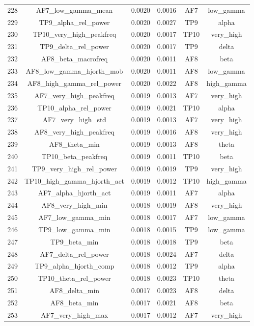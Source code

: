 \begin{table}[hptb]
\begin{table}
\begin{tabular}{cccccc}
228 & AF7_low_gamma_mean & 0.0020 & 0.0016 & AF7 & low_gamma \\
229 & TP9_alpha_rel_power & 0.0020 & 0.0027 & TP9 & alpha \\
230 & TP10_very_high_peakfreq & 0.0020 & 0.0017 & TP10 & very_high \\
231 & TP9_delta_rel_power & 0.0020 & 0.0017 & TP9 & delta \\
232 & AF8_beta_macrofreq & 0.0020 & 0.0011 & AF8 & beta \\
233 & AF8_low_gamma_hjorth_mob & 0.0020 & 0.0011 & AF8 & low_gamma \\
234 & AF8_high_gamma_rel_power & 0.0020 & 0.0022 & AF8 & high_gamma \\
235 & AF7_very_high_peakfreq & 0.0019 & 0.0013 & AF7 & very_high \\
236 & TP10_alpha_rel_power & 0.0019 & 0.0021 & TP10 & alpha \\
237 & AF7_very_high_std & 0.0019 & 0.0013 & AF7 & very_high \\
238 & AF8_very_high_peakfreq & 0.0019 & 0.0016 & AF8 & very_high \\
239 & AF8_theta_min & 0.0019 & 0.0013 & AF8 & theta \\
240 & TP10_beta_peakfreq & 0.0019 & 0.0011 & TP10 & beta \\
241 & TP9_very_high_rel_power & 0.0019 & 0.0019 & TP9 & very_high \\
242 & TP10_high_gamma_hjorth_act & 0.0019 & 0.0012 & TP10 & high_gamma \\
243 & AF7_alpha_hjorth_act & 0.0019 & 0.0011 & AF7 & alpha \\
244 & AF8_very_high_min & 0.0018 & 0.0019 & AF8 & very_high \\
245 & AF7_low_gamma_min & 0.0018 & 0.0017 & AF7 & low_gamma \\
246 & TP9_low_gamma_min & 0.0018 & 0.0015 & TP9 & low_gamma \\
247 & TP9_beta_min & 0.0018 & 0.0018 & TP9 & beta \\
248 & AF7_delta_rel_power & 0.0018 & 0.0024 & AF7 & delta \\
249 & TP9_alpha_hjorth_comp & 0.0018 & 0.0012 & TP9 & alpha \\
250 & TP10_theta_rel_power & 0.0018 & 0.0023 & TP10 & theta \\
251 & AF8_delta_min & 0.0017 & 0.0023 & AF8 & delta \\
252 & AF8_beta_min & 0.0017 & 0.0021 & AF8 & beta \\
253 & AF7_very_high_max & 0.0017 & 0.0012 & AF7 & very_high \\

\end{tabular}
\end{table}
\end{table}
